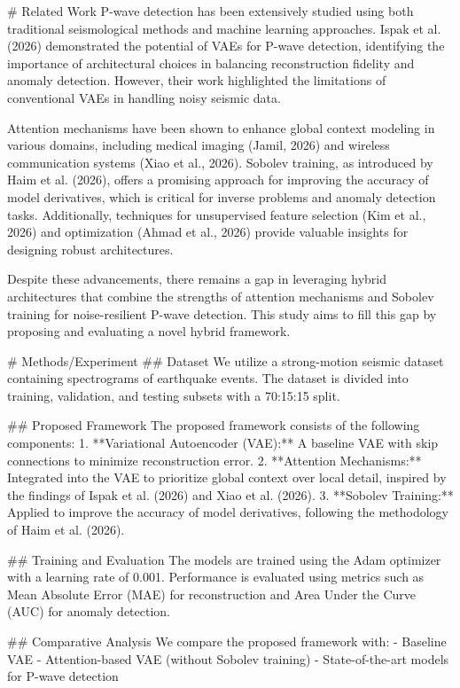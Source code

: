 # Related Work
P-wave detection has been extensively studied using both traditional seismological methods and machine learning approaches. Ispak et al. (2026) demonstrated the potential of VAEs for P-wave detection, identifying the importance of architectural choices in balancing reconstruction fidelity and anomaly detection. However, their work highlighted the limitations of conventional VAEs in handling noisy seismic data.

Attention mechanisms have been shown to enhance global context modeling in various domains, including medical imaging (Jamil, 2026) and wireless communication systems (Xiao et al., 2026). Sobolev training, as introduced by Haim et al. (2026), offers a promising approach for improving the accuracy of model derivatives, which is critical for inverse problems and anomaly detection tasks. Additionally, techniques for unsupervised feature selection (Kim et al., 2026) and optimization (Ahmad et al., 2026) provide valuable insights for designing robust architectures.

Despite these advancements, there remains a gap in leveraging hybrid architectures that combine the strengths of attention mechanisms and Sobolev training for noise-resilient P-wave detection. This study aims to fill this gap by proposing and evaluating a novel hybrid framework.

# Methods/Experiment
## Dataset
We utilize a strong-motion seismic dataset containing spectrograms of earthquake events. The dataset is divided into training, validation, and testing subsets with a 70:15:15 split.

## Proposed Framework
The proposed framework consists of the following components:
1. **Variational Autoencoder (VAE):** A baseline VAE with skip connections to minimize reconstruction error.
2. **Attention Mechanisms:** Integrated into the VAE to prioritize global context over local detail, inspired by the findings of Ispak et al. (2026) and Xiao et al. (2026).
3. **Sobolev Training:** Applied to improve the accuracy of model derivatives, following the methodology of Haim et al. (2026).

## Training and Evaluation
The models are trained using the Adam optimizer with a learning rate of 0.001. Performance is evaluated using metrics such as Mean Absolute Error (MAE) for reconstruction and Area Under the Curve (AUC) for anomaly detection.

## Comparative Analysis
We compare the proposed framework with:
- Baseline VAE
- Attention-based VAE (without Sobolev training)
- State-of-the-art models for P-wave detection

